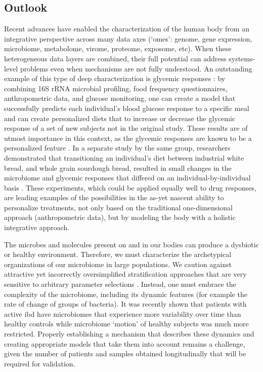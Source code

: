 \subsection{Outlook}
Recent advances have enabled the characterization of the human body from an integrative perspective across many data axes (`omes': genome, gene expression, microbiome, metabolome, virome, proteome, exposome, etc). When these heterogeneous data layers are combined, their full potential can address systems-level problems even when mechanisms are not fully understood. An outstanding example of this type of deep characterization is glycemic responses \cite{RN4181}:  by combining 16S rRNA microbial profiling, food frequency questionnaires, anthropometric data, and glucose monitoring, one can create a model that successfully predicts each individual's blood glucose response to a specific meal and can create personalized diets that to increase or decrease the glycemic response of a set of new subjects not in the original study. These results are of utmost importance in this context, as the glycemic responses are known to be a personalized feature \cite{RN4192, RN4191}. In a separate study by the same group, researchers demonstrated that transitioning an individual's diet between industrial white bread, and whole grain sourdough bread, resulted in small changes in the microbiome and glycemic responses that differed on an individual-by-individual basis \cite{RN4193}. These experiments, which could be applied equally well to drug responses, are leading examples of the possibilities in the as-yet nascent ability to personalize treatments, not only based on the traditional one-dimensional approach (anthropometric data), but by modeling the body with a holistic integrative approach.

The microbes and molecules present on and in our bodies can produce a dysbiotic or healthy environment. Therefore, we must characterize the archetypical organizations of our microbiome in large populations. We caution against attractive yet incorrectly oversimplified stratification approaches \cite{RN4194} that are very sensitive to arbitrary parameter selections \cite{RN4195, RN4196}. Instead, one must embrace the complexity of the microbiome, including its dynamic features (for example the rate of change of groups of bacteria). It was recently shown that patients with active \gls{ibd} have microbiomes that experience more variability over time than healthy controls \cite{RN1515} while microbiome `motion' of healthy subjects was much more restricted. Properly establishing a mechanism that describes these dynamics and creating appropriate models that take them into account remains a challenge, given the number of patients and samples obtained longitudinally that will be required for validation.


